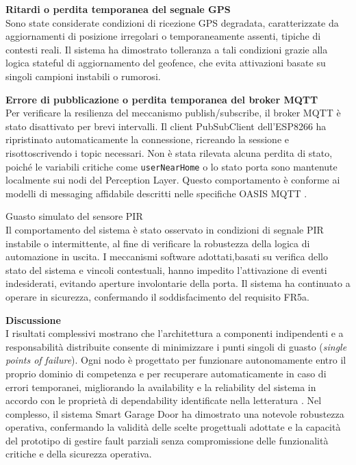 \textbf{Ritardi o perdita temporanea del segnale GPS} \\
Sono state considerate condizioni di ricezione GPS degradata, caratterizzate da
aggiornamenti di posizione irregolari o temporaneamente assenti, tipiche di contesti
reali. Il sistema ha dimostrato tolleranza a tali condizioni grazie alla logica stateful
di aggiornamento del geofence, che evita attivazioni basate su singoli campioni
instabili o rumorosi.

\textbf{Errore di pubblicazione o perdita temporanea del broker MQTT} \\
Per verificare la resilienza del meccanismo publish/subscribe, il broker MQTT è stato disattivato per brevi intervalli. Il client PubSubClient dell'ESP8266 ha ripristinato automaticamente la connessione, ricreando la sessione e risottoscrivendo i topic necessari. Non è stata rilevata alcuna perdita di stato, poiché le variabili critiche come \texttt{userNearHome} o lo stato porta sono mantenute localmente sui nodi del Perception Layer. Questo comportamento è conforme ai modelli di messaging affidabile descritti nelle specifiche OASIS MQTT \cite{MQTT5}.

Guasto simulato del sensore PIR \\
Il comportamento del sistema è stato osservato in condizioni di segnale PIR instabile
o intermittente, al fine di verificare la robustezza della logica di automazione in uscita.
I meccanismi software adottati,basati su verifica dello stato del sistema e vincoli contestuali, hanno impedito l’attivazione di eventi indesiderati, evitando aperture
involontarie della porta. Il sistema ha continuato a operare in sicurezza, confermando
il soddisfacimento del requisito FR5a.

\textbf{Discussione} \\
I risultati complessivi mostrano che l'architettura a componenti indipendenti e a responsabilità distribuite consente di minimizzare i punti singoli di guasto (\textit{single points of failure}). Ogni nodo è progettato per funzionare autonomamente entro il proprio dominio di competenza e per recuperare automaticamente in caso di errori temporanei, migliorando la availability e la reliability del sistema in accordo con le proprietà di dependability identificate nella letteratura \cite{Avizienis2004}.
Nel complesso, il sistema Smart Garage Door ha dimostrato una notevole robustezza operativa, confermando la validità delle scelte progettuali adottate e la capacità del prototipo di gestire fault parziali senza compromissione delle funzionalità critiche e della sicurezza operativa.


